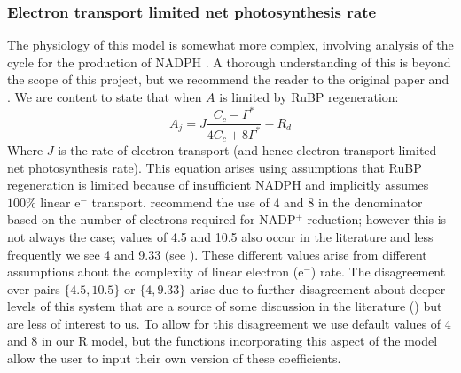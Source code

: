 \documentclass[11pt]{article} %
\begin{document}
\subsubsection{Electron transport limited net photosynthesis rate}
The physiology of this model is somewhat more complex, involving analysis of the cycle for the production of NADPH \cite{Farquharbiochemicalmodelphotosynthetic1980}. A thorough understanding of this is beyond the scope of this project, but we recommend the reader to the original paper \cite{Farquharbiochemicalmodelphotosynthetic1980} and \citet{CaemmererBiochemicalmodelsleaf2000}. We are content to state that when $A$ is limited by RuBP regeneration:
\begin{equation} \label{RuBP_photosynthesis}
A_j = J\frac{C_c - \Gamma^*}{4C_c + 8\Gamma^*}-R_d
\end{equation}
Where $J$ is the rate of electron transport (and hence electron transport limited net photosynthesis rate). This equation arises using assumptions that RuBP regeneration is limited because of insufficient NADPH and implicitly assumes $100\%$  linear e$^-$ transport. \citet{SharkeyFittingphotosyntheticcarbon2007} recommend the use of $4$ and $8$ in the denominator based on the number of electrons required for NADP$^+$ reduction; however this is not always the case; values of 4.5 and 10.5 also occur in the literature and less frequently we see 4 and 9.33 (see \cite{SharkeyFittingphotosyntheticcarbon2007}\cite{YinUsingcombinedmeasurements2009}\cite{YinC3C4photosynthesis2009}). These different values arise from different assumptions about the complexity of linear electron (e$^-$) rate. The disagreement over pairs $\{4.5, 10.5\}$ or $\{4, 9.33\}$ arise due to further disagreement about deeper levels of this system that are a source of some discussion in the literature (\cite{CaemmererBiochemicalmodelsleaf2000}\cite{YinUsingcombinedmeasurements2009}) but are less of interest to us. To allow for this disagreement we use default values of 4 and 8 in our R model, but the functions incorporating this aspect of the model allow the user to input their own version of these coefficients.
\end{document}
